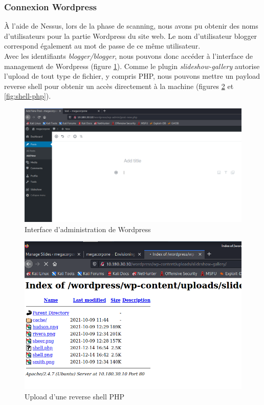 \documentclass[french,paper=a4,oneside,captions=tableheading]{article}
\begin{document}
\subsubsection{Connexion Wordpress}

À l'aide de Nessus, lors de la phase de scanning, nous avons pu obtenir des noms d'utilisateurs pour la partie Wordpress du site web. Le nom d'utilisateur blogger correspond également au mot de passe de ce même utilisateur.\\
Avec les identifiants \textit{blogger/blogger}, nous pouvons donc accéder à l'interface de management de Wordpress (figure \ref{fig:wordpress-admin}). Comme le plugin \textit{slideshow-gallery} autorise l'upload de tout type de fichier, y compris PHP, nous pouvons mettre un payload reverse shell pour obtenir un accès directement à la machine (figures \ref{fig:wordpress-upload} et \ref{fig:shell-php}).

\begin{figure}[H]
    \centering
    \includegraphics[width=0.99\linewidth]{images/wordpress-admin.png}
    \caption{Interface d'administration de Wordpress}
    \label{fig:wordpress-admin}
\end{figure}

\begin{figure}[H]
    \centering
    \includegraphics[width=0.65\linewidth]{images/wordpress-upload.png}
    \caption{Upload d'une reverse shell PHP}
    \label{fig:wordpress-upload}
\end{figure}
\end{document}
